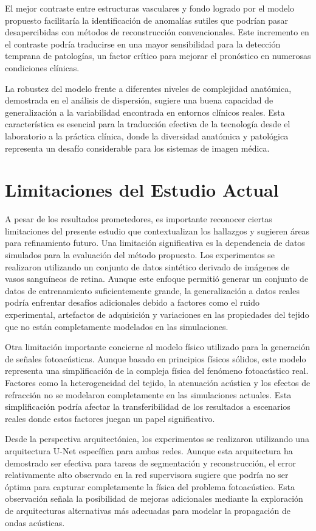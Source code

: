 El mejor contraste entre estructuras vasculares y fondo logrado por el modelo propuesto facilitaría la identificación de anomalías sutiles que podrían pasar desapercibidas con métodos de reconstrucción convencionales. Este incremento en el contraste podría traducirse en una mayor sensibilidad para la detección temprana de patologías, un factor crítico para mejorar el pronóstico en numerosas condiciones clínicas.

La robustez del modelo frente a diferentes niveles de complejidad anatómica, demostrada en el análisis de dispersión, sugiere una buena capacidad de generalización a la variabilidad encontrada en entornos clínicos reales. Esta característica es esencial para la traducción efectiva de la tecnología desde el laboratorio a la práctica clínica, donde la diversidad anatómica y patológica representa un desafío considerable para los sistemas de imagen médica.

\section{Limitaciones del Estudio Actual}

A pesar de los resultados prometedores, es importante reconocer ciertas limitaciones del presente estudio que contextualizan los hallazgos y sugieren áreas para refinamiento futuro. Una limitación significativa es la dependencia de datos simulados para la evaluación del método propuesto. Los experimentos se realizaron utilizando un conjunto de datos sintético derivado de imágenes de vasos sanguíneos de retina. Aunque este enfoque permitió generar un conjunto de datos de entrenamiento suficientemente grande, la generalización a datos reales podría enfrentar desafíos adicionales debido a factores como el ruido experimental, artefactos de adquisición y variaciones en las propiedades del tejido que no están completamente modelados en las simulaciones.

Otra limitación importante concierne al modelo físico utilizado para la generación de señales fotoacústicas. Aunque basado en principios físicos sólidos, este modelo representa una simplificación de la compleja física del fenómeno fotoacústico real. Factores como la heterogeneidad del tejido, la atenuación acústica y los efectos de refracción no se modelaron completamente en las simulaciones actuales. Esta simplificación podría afectar la transferibilidad de los resultados a escenarios reales donde estos factores juegan un papel significativo.

Desde la perspectiva arquitectónica, los experimentos se realizaron utilizando una arquitectura U-Net específica para ambas redes. Aunque esta arquitectura ha demostrado ser efectiva para tareas de segmentación y reconstrucción, el error relativamente alto observado en la red supervisora sugiere que podría no ser óptima para capturar completamente la física del problema fotoacústico. Esta observación señala la posibilidad de mejoras adicionales mediante la exploración de arquitecturas alternativas más adecuadas para modelar la propagación de ondas acústicas.

